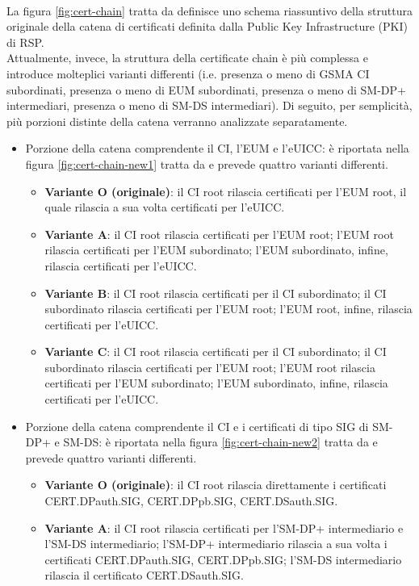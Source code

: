 \documentclass[10pt, oneside]{book}
\begin{document}
\\La figura \ref{fig:cert-chain} tratta da \cite{GSMA-docs-old} definisce uno schema riassuntivo della struttura originale della catena di certificati definita dalla Public Key Infrastructure (PKI) di RSP.\\
Attualmente, invece, la struttura della certificate chain è più complessa e introduce molteplici varianti differenti (i.e. presenza o meno di GSMA CI subordinati, presenza o meno di EUM subordinati, presenza o meno di SM-DP+ intermediari, presenza o meno di SM-DS intermediari). Di seguito, per semplicità, più porzioni distinte della catena verranno analizzate separatamente.
\begin{itemize}
\item Porzione della catena comprendente il CI, l'EUM e l'eUICC: è riportata nella figura \ref{fig:cert-chain-new1} tratta da \cite{GSMA-docs-new} e prevede quattro varianti differenti.
\begin{itemize}
\item \textbf{Variante O (originale)}: il CI root rilascia certificati per l'EUM root, il quale rilascia a sua volta certificati per l'eUICC.
\item \textbf{Variante A}: il CI root rilascia certificati per l'EUM root; l'EUM root rilascia certificati per l'EUM subordinato; l'EUM subordinato, infine, rilascia certificati per l'eUICC.
\item \textbf{Variante B}: il CI root rilascia certificati per il CI subordinato; il CI subordinato rilascia certificati per l'EUM root; l'EUM root, infine, rilascia certificati per l'eUICC.
\item \textbf{Variante C}: il CI root rilascia certificati per il CI subordinato; il CI subordinato rilascia certificati per l'EUM root; l'EUM root rilascia certificati per l'EUM subordinato; l'EUM subordinato, infine, rilascia certificati per l'eUICC.
\end{itemize}
\item Porzione della catena comprendente il CI e i certificati di tipo SIG di SM-DP+ e SM-DS: è riportata nella figura \ref{fig:cert-chain-new2} tratta da \cite{GSMA-docs-new} e prevede quattro varianti differenti.
\begin{itemize}
\item \textbf{Variante O (originale)}: il CI root rilascia direttamente i certificati CERT.DPauth.SIG, CERT.DPpb.SIG, CERT.DSauth.SIG.
\item \textbf{Variante A}: il CI root rilascia certificati per l'SM-DP+ intermediario e l'SM-DS intermediario; l'SM-DP+ intermediario rilascia a sua volta i certificati  CERT.DPauth.SIG, CERT.DPpb.SIG; l'SM-DS intermediario rilascia il certificato CERT.DSauth.SIG.

\end{itemize}
\end{itemize}
\end{document}
